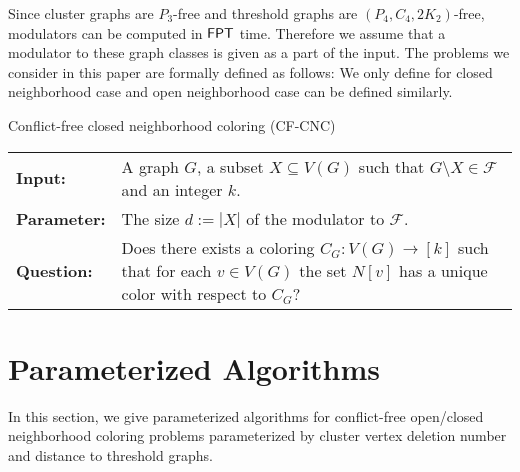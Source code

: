 \documentclass[svgnames]{llncs}
\newcommand{\fpt}{\ensuremath{\sf{FPT}}\xspace}
\newcommand{\problembox}[4]{
\begin{framed}
{\sc #1} \\
\begin{tabular}{p{.18\textwidth} p{.8\textwidth}}
\hfill \bf Input: & {#2}\\
\hfill \bf Parameter: & {#3}\\
\hfill \bf Question: & {#4}\\
\end{tabular}
\end{framed}
}
\begin{document}
Since cluster graphs are $P_3$-free and threshold graphs are $(P_4, C_4, 2K_2)$-free,  modulators can be computed in \fpt{} time. 
Therefore we assume that a modulator to these graph classes is given as a part of the input. 
The problems we consider in this paper are formally defined as follows:
We only define for closed neighborhood case and open neighborhood case can be defined similarly.
 
\problembox{\sc Conflict-free closed neighborhood coloring (CF-CNC)}{A graph $G$, a subset $X \subseteq V(G)$ such that $G \setminus X \in \mathcal{F}$ and an integer $k$.} {The size $d:=|X|$ of the modulator to $\mathcal{F}$.}{Does there exists a coloring $C_G: V(G) \rightarrow [k]$ such that for each $v \in V(G)$ the set $N[v]$ has a unique color with respect to $C_G$?}


\section{Parameterized Algorithms}
In this section, we give parameterized algorithms for conflict-free open/closed neighborhood coloring problems parameterized by cluster vertex deletion number and distance to threshold graphs.
\end{document}
